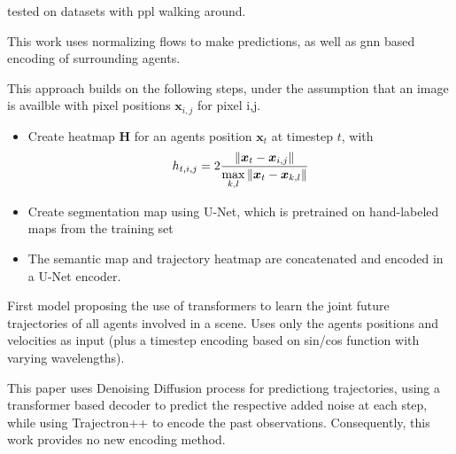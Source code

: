 tested on datasets with ppl walking around.




\cite{scholler2021flomo} This work uses normalizing flows to make predictions, as well as gnn based encoding of surrounding agents.



\cite{mangalam2021goals} This approach builds on the following steps, under the assumption that an image is availble with pixel positions $\bm{x}_{i,j}$ for pixel i,j.
\begin{itemize}
    \item Create heatmap $\bm{H}$ for an agents position $\bm{x}_t$ at timestep $t$, with 
    \begin{equation}
        h_{t,i,j} = 2 {\left\Vert \bm{x}_t - \bm{x}_{i,j} \right\Vert \over{ \underset{k,l}{\max}\left\Vert \bm{x}_t - \bm{x}_{k,l} \right\Vert}}
    \end{equation}
    \item Create segmentation map using U-Net, which is pretrained on hand-labeled maps from the training set
    \item The semantic map and trajectory heatmap are concatenated and encoded in a U-Net encoder.
\end{itemize}



\cite{yuan2021agentformer} First model proposing the use of transformers to learn the joint future trajectories of all agents involved in a scene. Uses only the agents positions and velocities as input (plus a timestep encoding based on sin/cos function with varying wavelengths). 



\cite{navarro2022social}


\cite{gu2022stochastic} This paper uses Denoising Diffusion process for predictiong trajectories, using a transformer based decoder to predict the respective added noise at each step, while using Trajectron++ to encode the past observations. Consequently, this work provides no new encoding method.

